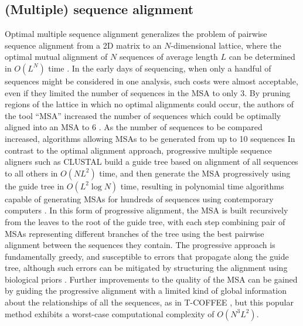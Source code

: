 \subsection{(Multiple) sequence alignment}
\label{sec:MSA}

Optimal multiple sequence alignment generalizes the problem of pairwise sequence alignment from a 2D matrix to an $N$-dimensional lattice, where the optimal mutual alignment of $N$ sequences of average length $L$ can be determined in $O(L^{N})$ time \cite{carrillo1988multiple}.
In the early days of sequencing, when only a handful of sequences might be considered in one analysis, such costs were almost acceptable, even if they limited the number of sequences in the MSA to only 3.
By pruning regions of the lattice in which no optimal alignments could occur, the authors of the tool ``MSA'' increased the number of sequences which could be optimally aligned into an MSA to 6 \cite{lipman1989tool}.
As the number of sequences to be compared increased, algorithms allowing MSAs to be generated from up to 10 sequences
In contrast to the optimal alignment approach, progressive multiple sequence aligners such as CLUSTAL build a guide tree based on alignment of all sequences to all others in $O(NL^{2})$ time, and then generate the MSA progressively using the guide tree in $O(L^{2}\log N)$ time, resulting in polynomial time algorithms capable of generating MSAs for hundreds of sequences using contemporary computers \cite{higgins1988clustal}.
In this form of progressive alignment, the MSA is built recursively from the leaves to the root of the guide tree, with each step combining pair of MSAs representing different branches of the tree using the best pairwise alignment between the sequences they contain.
The progressive approach is fundamentally greedy, and susceptible to errors that propagate along the guide tree, although such errors can be mitigated by structuring the alignment using biological priors \cite{thompson1994clustal}.
Further improvements to the quality of the MSA can be gained by guiding the progressive alignment with a limited kind of global information about the relationships of all the sequences, as in T-COFFEE \cite{notredame2000t}, but this popular method exhibits a worst-case computational complexity of $O(N^{3}L^{2})$.

